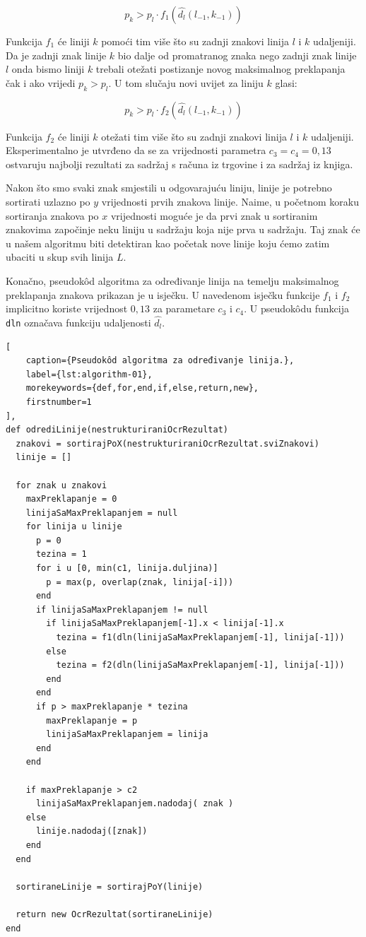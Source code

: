 \documentclass[times, utf8, zavrsni]{fer}
\begin{document}
\begin{equation}
p_k > p_l \cdot f_1(\hat{d_l}(l_{-1},k_{-1}))
\end{equation}

Funkcija $f_1$ će liniji $k$ pomoći tim više što su zadnji znakovi linija
$l$ i $k$ udaljeniji. Da je zadnji znak linije $k$ bio dalje od
promatranog znaka nego zadnji znak linije $l$ onda bismo liniji $k$ trebali
otežati postizanje novog maksimalnog preklapanja čak i ako vrijedi $p_k > p_l$. U tom slučaju novi uvijet za liniju $k$ glasi:

\begin{equation}
    p_k > p_l \cdot f_2(\hat{d_l}(l_{-1},k_{-1}))
\end{equation}

Funkcija $f_2$ će liniji $k$ otežati tim više što su zadnji znakovi linija
$l$ i $k$ udaljeniji. Eksperimentalno je utvrđeno da se za vrijednosti parametra
$c_3 = c_4 = 0{,}13$ ostvaruju najbolji rezultati za sadržaj s računa iz
trgovine i za sadržaj iz knjiga.

Nakon što smo svaki znak smjestili u odgovarajuću liniju, linije je potrebno
sortirati uzlazno po $y$ vrijednosti prvih znakova linije. Naime, u početnom
koraku sortiranja znakova po $x$ vrijednosti moguće je da prvi znak
u sortiranim znakovima započinje neku liniju u sadržaju koja nije prva u sadržaju. Taj znak će u našem algoritmu biti detektiran kao početak nove linije koju ćemo zatim ubaciti u skup svih linija $L$.

Konačno, pseudokôd algoritma za određivanje linija na temelju maksimalnog
preklapanja znakova prikazan je u isječku. U navedenom isječku funkcije $f_1$ i
$f_2$ implicitno koriste vrijednost $0{,}13$ za parametare $c_3$ i $c_4$.
U pseudokôdu funkcija \lstinline{dln} označava funkciju udaljenosti $\hat{d_l}$.

\begin{lstlisting}[
    caption={Pseudokôd algoritma za određivanje linija.},
    label={lst:algorithm-01},
    morekeywords={def,for,end,if,else,return,new},
    firstnumber=1
],
def odrediLinije(nestrukturiraniOcrRezultat)
  znakovi = sortirajPoX(nestrukturiraniOcrRezultat.sviZnakovi)
  linije = []

  for znak u znakovi
    maxPreklapanje = 0
    linijaSaMaxPreklapanjem = null
    for linija u linije
      p = 0
      tezina = 1
      for i u [0, min(c1, linija.duljina)]
        p = max(p, overlap(znak, linija[-i]))
      end
      if linijaSaMaxPreklapanjem != null
        if linijaSaMaxPreklapanjem[-1].x < linija[-1].x
          tezina = f1(dln(linijaSaMaxPreklapanjem[-1], linija[-1]))
        else
          tezina = f2(dln(linijaSaMaxPreklapanjem[-1], linija[-1]))
        end
      end
      if p > maxPreklapanje * tezina
        maxPreklapanje = p
        linijaSaMaxPreklapanjem = linija
      end
    end

    if maxPreklapanje > c2
      linijaSaMaxPreklapanjem.nadodaj( znak )
    else
      linije.nadodaj([znak])
    end
  end

  sortiraneLinije = sortirajPoY(linije)

  return new OcrRezultat(sortiraneLinije)
end
\end{lstlisting}
\end{document}
